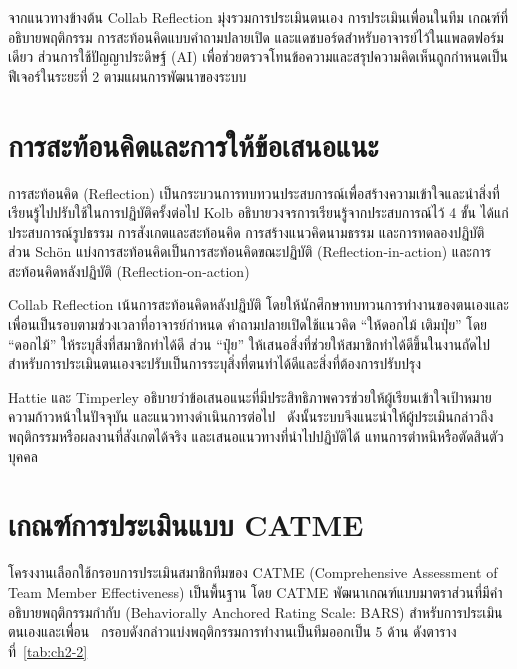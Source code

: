 จากแนวทางข้างต้น Collab Reflection มุ่งรวมการประเมินตนเอง การประเมินเพื่อนในทีม เกณฑ์ที่อธิบายพฤติกรรม การสะท้อนคิดแบบคำถามปลายเปิด และแดชบอร์ดสำหรับอาจารย์ไว้ในแพลตฟอร์มเดียว ส่วนการใช้ปัญญาประดิษฐ์ (AI) เพื่อช่วยตรวจโทนข้อความและสรุปความคิดเห็นถูกกำหนดเป็นฟีเจอร์ในระยะที่ 2 ตามแผนการพัฒนาของระบบ

\section{การสะท้อนคิดและการให้ข้อเสนอแนะ}

การสะท้อนคิด (Reflection) เป็นกระบวนการทบทวนประสบการณ์เพื่อสร้างความเข้าใจและนำสิ่งที่เรียนรู้ไปปรับใช้ในการปฏิบัติครั้งต่อไป Kolb อธิบายวงจรการเรียนรู้จากประสบการณ์ไว้ 4 ขั้น ได้แก่ ประสบการณ์รูปธรรม การสังเกตและสะท้อนคิด การสร้างแนวคิดนามธรรม และการทดลองปฏิบัติ~\cite{kolb1984experiential} ส่วน Schön แบ่งการสะท้อนคิดเป็นการสะท้อนคิดขณะปฏิบัติ (Reflection-in-action) และการสะท้อนคิดหลังปฏิบัติ (Reflection-on-action)~\cite{schon1983reflective}

Collab Reflection เน้นการสะท้อนคิดหลังปฏิบัติ โดยให้นักศึกษาทบทวนการทำงานของตนเองและเพื่อนเป็นรอบตามช่วงเวลาที่อาจารย์กำหนด คำถามปลายเปิดใช้แนวคิด ``ให้ดอกไม้ เติมปุ๋ย'' โดย ``ดอกไม้'' ให้ระบุสิ่งที่สมาชิกทำได้ดี ส่วน ``ปุ๋ย'' ให้เสนอสิ่งที่ช่วยให้สมาชิกทำได้ดีขึ้นในงานถัดไป สำหรับการประเมินตนเองจะปรับเป็นการระบุสิ่งที่ตนทำได้ดีและสิ่งที่ต้องการปรับปรุง

Hattie และ Timperley อธิบายว่าข้อเสนอแนะที่มีประสิทธิภาพควรช่วยให้ผู้เรียนเข้าใจเป้าหมาย ความก้าวหน้าในปัจจุบัน และแนวทางดำเนินการต่อไป~\cite{hattie2007feedback} ดังนั้นระบบจึงแนะนำให้ผู้ประเมินกล่าวถึงพฤติกรรมหรือผลงานที่สังเกตได้จริง และเสนอแนวทางที่นำไปปฏิบัติได้ แทนการตำหนิหรือตัดสินตัวบุคคล

\section{เกณฑ์การประเมินแบบ CATME}

โครงงานเลือกใช้กรอบการประเมินสมาชิกทีมของ CATME (Comprehensive Assessment of Team Member Effectiveness) เป็นพื้นฐาน โดย CATME พัฒนาเกณฑ์แบบมาตราส่วนที่มีคำอธิบายพฤติกรรมกำกับ (Behaviorally Anchored Rating Scale: BARS) สำหรับการประเมินตนเองและเพื่อน~\cite{ohland2012catme} กรอบดังกล่าวแบ่งพฤติกรรมการทำงานเป็นทีมออกเป็น 5 ด้าน ดังตารางที่~\ref{tab:ch2-2}

